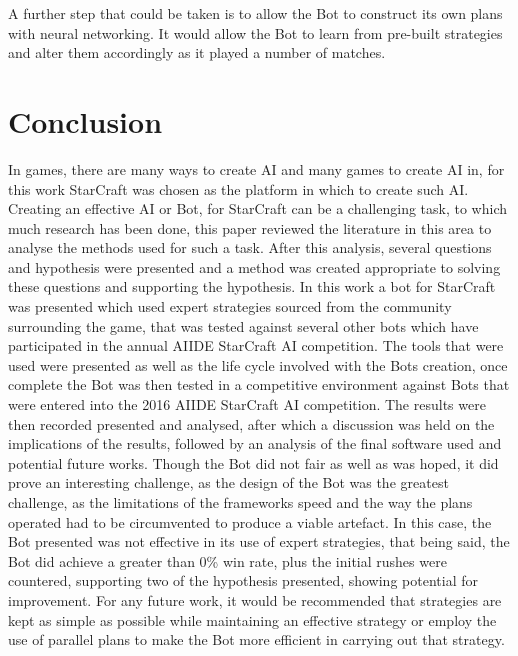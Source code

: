\documentclass[journal]{IEEEtran}
\begin{document}
	A further step that could be taken is to allow the Bot to construct its own plans with neural networking. It would allow the Bot to learn from pre-built strategies and alter them accordingly as it played a number of matches.
	
	\section{Conclusion}
	In games, there are many ways to create AI and many games to create AI in, for this work StarCraft was chosen as the platform in which to create such AI. Creating an effective AI or Bot, for StarCraft can be a challenging task, to which much research has been done, this paper reviewed the literature in this area to analyse the methods used for such a task. After this analysis, several questions and hypothesis were presented and a method was created appropriate to solving these questions and supporting the hypothesis.    In this work a bot for StarCraft was presented which used expert strategies sourced from the community surrounding the game, that was tested against several other bots which have participated in the annual AIIDE StarCraft AI competition. The tools that were used were presented as well as the life cycle involved with the Bots creation, once complete the Bot was then tested in a competitive environment against Bots that were entered into the 2016 AIIDE StarCraft AI competition. The results were then recorded presented and analysed, after which a discussion was held on the implications of the results, followed by an analysis of the final software used and potential future works. 
	Though the Bot did not fair as well as was hoped, it did prove an interesting challenge, as the design of the Bot was the greatest challenge, as the limitations of the frameworks speed and the way the plans operated had to be circumvented to produce a viable artefact. In this case, the Bot presented was not effective in its use of expert strategies, that being said, the Bot did achieve a greater than 0\% win rate, plus the initial rushes were countered, supporting two of the hypothesis presented, showing potential for improvement. For any future work, it would be recommended that strategies are kept as simple as possible while maintaining an effective strategy or employ the use of parallel plans to make the Bot more efficient in carrying out that strategy.    
	
	
	
	
	
\end{document}
